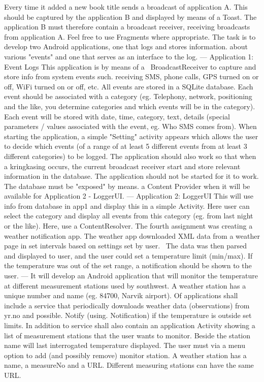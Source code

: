 Every time it added a new book title sends a broadcast of application A. 
This should be captured by the application B and displayed by means of a Toast.
The application B must therefore contain a broadcast receiver, receiving broadcasts from application A.
Feel free to use Fragments where appropriate.
\vspace{0.5em}\newline
The task is to develop two Android applications, one that logs and stores information. about various "events" and one that serves as an interface to the log.
---
Application 1: Event Logs
This application is by means of a  BroadcastReceiver to capture and store info from system events such. receiving SMS, phone calls, GPS turned on or off, WiFi turned on or off, etc. 
All events are stored in a SQLite database.
Each event should be associated with a category (eg. Telephony, network, positioning and the like, you determine categories and which events will be in the category).
Each event will be stored with date, time, category, text, details (special parameters / values associated with the event, eg. Who SMS comes from).
When starting the application, a simple "Setting" activity appears which allows the user to decide which events (of a range of at least 5 different events from at least 
3 different categories) to be logged.
The application should also work so that when a kringkasing occurs, the current broadcast receiver start and store relevant information in the database. 
The application should not be started for it to work. 
The database must be "exposed" by means. a Content Provider when it will be available for Application 2 - LoggerUI.
---
Application 2: LoggerUI
This will use info from database in app1 and display this in a simple Activity. 
Here user can select the category and display all events from this category (eg. from last night or the like). 
Here, use a ContentResolver.
\vspace{0.5em}\newline
The fourth assignment was creating a weather notification app. 
The weather app downloaded XML data from a weather page in set intervals based on settings set by user. 
The data was then parsed and displayed to user, and the user could set a temperature limit (min/max). 
If the temperature was out of the set range, a notification should be shown to the user.
---
It will develop an Android application that will monitor the temperature at different measurement stations used by southwest. 
A weather station has a unique number and name (eg. 84700, Narvik airport). 
Of applications shall include a service that periodically downloads weather data (observations) from yr.no and possible. 
Notify (using. Notification) if the temperature is outside set limits.
In addition to service shall also contain an application Activity showing a list of measurement stations that the user wants to monitor. 
Beside the station name will last interrogated temperature displayed. 
The user must via a menu option to add (and possibly remove) monitor station. 
A weather station has a name, a measureNo and a URL.
Different measuring stations can have the same URL.

